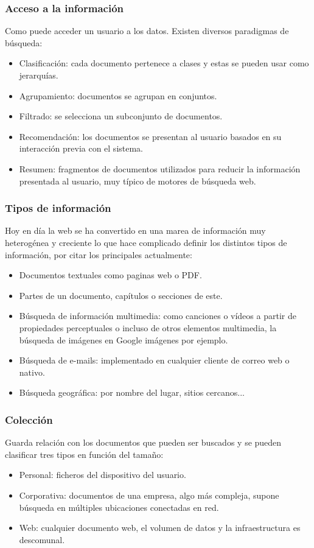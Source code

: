 \subsubsection{Acceso a la información}
Como puede acceder un usuario a los datos. Existen diversos paradigmas de búsqueda:
\begin{itemize}
	\item Clasificación: cada documento pertenece a clases y estas se pueden usar como jerarquías.
	\item Agrupamiento: documentos se agrupan en conjuntos.
	\item Filtrado: se selecciona un subconjunto de documentos.
	\item Recomendación: los documentos se presentan al usuario basados en su interacción previa con el sistema.
	\item Resumen: fragmentos de documentos utilizados para reducir la información presentada al usuario, muy típico de motores de búsqueda web.
\end{itemize}
\subsubsection{Tipos de información}
Hoy en día la web se ha convertido en una marea de información muy heterogénea y creciente lo que hace complicado definir los distintos tipos de información, por citar los principales actualmente:
\begin{itemize}
	\item Documentos textuales como paginas web o \acrshort{PDF}.
	\item Partes de un documento, capítulos o secciones de este.
	\item Búsqueda de información multimedia: como canciones o vídeos a partir de propiedades perceptuales o incluso de otros elementos multimedia, la búsqueda de imágenes en Google imágenes por ejemplo.
	\item Búsqueda de e-mails: implementado en cualquier cliente de correo web o nativo.
	\item Búsqueda geográfica: por nombre del lugar, sitios cercanos...
\end{itemize}
\subsubsection{Colección}
Guarda relación con los documentos que pueden ser buscados y se pueden clasificar tres tipos en función del tamaño:
\begin{itemize}
		\item Personal: ficheros del dispositivo del usuario.
		\item Corporativa: documentos de una empresa, algo más compleja, supone búsqueda en múltiples ubicaciones conectadas en red.
		\item Web: cualquier documento web, el volumen de datos y la infraestructura es descomunal.
\end{itemize}


